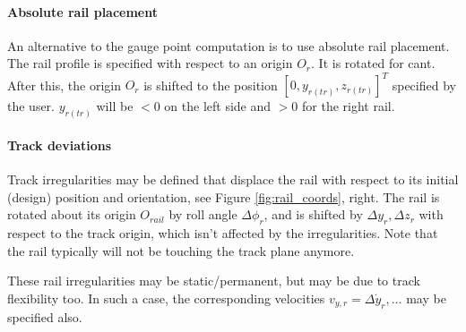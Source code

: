 \documentclass[12pt]{report}
\renewcommand{\magenta}[1]{}
\begin{document}
\paragraph{Absolute rail placement}

An alternative to the gauge point computation is to use absolute rail
placement. The rail profile is specified with respect to an origin $O_r$.
It is rotated for cant. After this, the origin $O_r$ is shifted to the
position $[0,y_{r(tr)},z_{r(tr)}]^T$ specified by the user. $y_{r(tr)}$
will be $<0$ on the left side and $>0$ for the right rail.

\paragraph{Track deviations}

Track irregularities may be defined that displace the rail with respect to
its initial (design) position and orientation, see Figure
\ref{fig:rail_coords}, right. The rail is rotated about its origin
$O_{rail}$ by roll angle $\Delta\phi_{r}$, and is shifted by $\Delta
y_{r},\Delta z_{r}$ with respect to the track origin, which isn't
affected by the irregularities. Note that the rail typically will not be
touching the track plane anymore.

These rail irregularities may be static/permanent, but may be due to track
flexibility too. In such a case, the corresponding velocities
$v_{y,r}=\Delta\dot{y}_{r}, \ldots$ may be specified also.

\magenta{
\paragraph{Massless rail model}

Rail deflections may be computed resulting from the lateral and
vertical contact forces.
\begin{eqnarray}\label{eq:cntc_defl}
   F_{y(tr)} + F^*_y - k^*_y \delta y_{defl} = 0 &\leftrightarrow&
   \delta y_{\defl} = \frac{F_{y(tr)} + F^*_y}{ k^*_y } , \\
   F_{z(tr)} + F^*_z - k^*_z \delta z_{defl} = 0 &\leftrightarrow&
   \delta z_{\defl} = \frac{F_{z(tr)} + F^*_z}{ k^*_z } .
\end{eqnarray}
Here $F_y^*, F_z^*$ are prescribed forces on the rail at zero deflection.
This can be used to implement a massless rail with stiffness and damping:
\begin{equation}\label{eq:massless}
   F_{y(tr)}^{n+1} + F^{n+1}_{\defl,y} = 0, \;\;
   F^{n+1}_{\defl,y} = -k_y \delta y^{n+1}_{defl} - c_y \frac{\delta
        y^{n+1}_{defl} - \delta y^n_{defl}}{ \delta t }
\end{equation}
Here $F_{y(tr)}^{n+1}$ is the contact force on the rail, at the end of a
time step in a time integration procedure, $F_{\defl,y}$ the lateral force
from the ground on the rail, with balance equation $\sum F=0$.
Equation (\ref{eq:cntc_defl}) corresponds to (\ref{eq:massless}) with
\begin{equation}
   k^*_y = k_y + \frac{c_y}{\delta t}, \;\; 
   F^*_y = \frac{ c_y \delta y^n}{\delta t} .
\end{equation}
}
\end{document}
